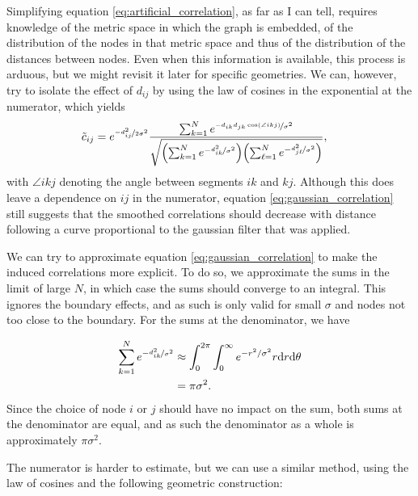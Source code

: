 \documentclass{article}
\begin{document}
\begin{multicols}{2}
Simplifying equation \ref{eq:artificial_correlation}, as far as I can tell, requires knowledge of the metric space in which the graph is embedded, of the distribution of the nodes in that metric space and thus of the distribution of the distances between nodes. Even when this information is available, this process is arduous, but we might revisit it later for specific geometries. We can, however, try to isolate the effect of $d_{ij}$ by using the law of cosines in the exponential at the numerator, which yields
\begin{align}
    \Tilde{c}_{ij} &= e^{\nicefrac{-d_{ij}^2}{2\sigma^2}}\frac{\sum_{k = 1}^N e^{\nicefrac{-d_{ik}d_{jk}\cos(\angle ikj)}{\sigma^2}}}{\sqrt{\qty(\sum_{k=1}^N e^{-\nicefrac{d_{ik}^2}{\sigma^2}})\qty(\sum_{\ell=1}^N e^{-\nicefrac{d_{j\ell}^2}{\sigma^2}})}},
    \label{eq:gaussian_correlation}
\end{align}
with $\angle ikj$ denoting the angle between segments $ik$ and $kj$. Although this does leave a dependence on $ij$ in the numerator, equation \ref{eq:gaussian_correlation} still suggests that the smoothed correlations should decrease with distance following a curve proportional to the gaussian filter that was applied.

We can try to approximate equation \ref{eq:gaussian_correlation} to make the induced correlations more explicit. To do so, we approximate the sums in the limit of large $N$, in which case the sums should converge to an integral. This ignores the boundary effects, and as such is only valid for small $\sigma$ and nodes not too close to the boundary. For the sums at the denominator, we have

\begin{align*}
    \sum_{k=1}^N e^{-\nicefrac{d_{ik}^2}{\sigma^2}} &\approx \int_0^{2\pi}\int_0^\infty e^{-r^2/\sigma^2}r\dd r\dd\theta\\
    &= \pi\sigma^2.
\end{align*}
Since the choice of node $i$ or $j$ should have no impact on the sum, both sums at the denominator are equal, and as such the denominator as a whole is approximately $\pi\sigma^2$. 

The numerator is harder to estimate, but we can use a similar method, using the law of cosines and the following geometric construction:

\begin{center}
\end{center}
\end{multicols}
\end{document}
